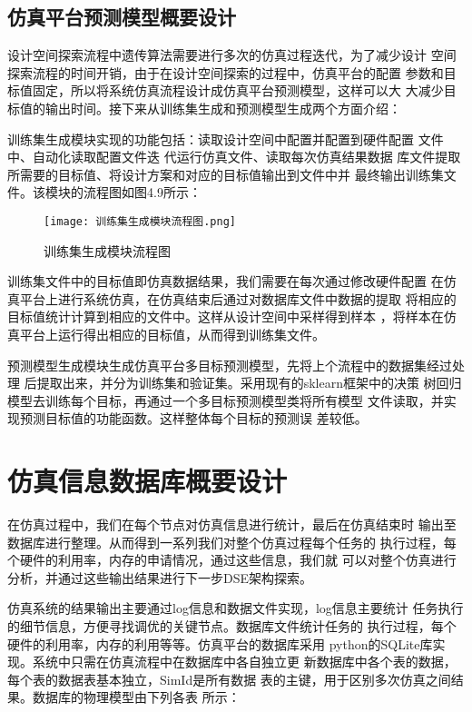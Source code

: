 \subsection{仿真平台预测模型概要设计}
设计空间探索流程中遗传算法需要进行多次的仿真过程迭代，为了减少设计
空间探索流程的时间开销，由于在设计空间探索的过程中，仿真平台的配置
参数和目标值固定，所以将系统仿真流程设计成仿真平台预测模型，这样可以大
大减少目标值的输出时间。接下来从训练集生成和预测模型生成两个方面介绍：

训练集生成模块实现的功能包括：读取设计空间中配置并配置到硬件配置
文件中、自动化读取配置文件迭  代运行仿真文件、读取每次仿真结果数据
库文件提取所需要的目标值、将设计方案和对应的目标值输出到文件中并
最终输出训练集文件。该模块的流程图如图4.9所示：

\begin{figure}[htb]
    \centering
    \texttt{[image: 训练集生成模块流程图.png]}
    \caption{训练集生成模块流程图}
    \label{fig:badge}
\end{figure}

训练集文件中的目标值即仿真数据结果，我们需要在每次通过修改硬件配置
在仿真平台上进行系统仿真，在仿真结束后通过对数据库文件中数据的提取
将相应的目标值统计计算到相应的文件中。这样从设计空间中采样得到样本
，将样本在仿真平台上运行得出相应的目标值，从而得到训练集文件。

预测模型生成模块生成仿真平台多目标预测模型，先将上个流程中的数据集经过处理
后提取出来，并分为训练集和验证集。采用现有的sklearn框架中的决策
树回归模型\cite{34}去训练每个目标，再通过一个多目标预测模型类将所有模型
文件读取，并实现预测目标值的功能函数。这样整体每个目标的预测误
差较低。

\section{仿真信息数据库概要设计}
在仿真过程中，我们在每个节点对仿真信息进行统计，最后在仿真结束时
输出至数据库进行整理。从而得到一系列我们对整个仿真过程每个任务的
执行过程，每个硬件的利用率，内存的申请情况，通过这些信息，我们就
可以对整个仿真进行分析，并通过这些输出结果进行下一步DSE架构探索。

仿真系统的结果输出主要通过log信息和数据文件实现，log信息主要统计
任务执行的细节信息，方便寻找调优的关键节点。数据库文件统计任务的
执行过程，每个硬件的利用率，内存的利用等等。仿真平台的数据库采用
python的SQLite库实现。系统中只需在仿真流程中在数据库中各自独立更
新数据库中各个表的数据，每个表的数据表基本独立，SimId是所有数据
表的主键，用于区别多次仿真之间结果。数据库的物理模型由下列各表
所示：

